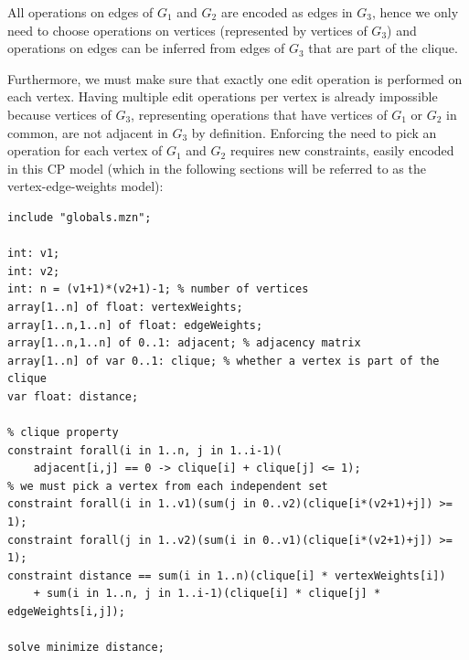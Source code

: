 \documentclass{article}
\theoremstyle{definition}
\begin{document}
All operations on edges of $G_1$ and $G_2$ are encoded as edges in $G_3$, hence we only need to choose operations on vertices (represented by vertices of $G_3$) and operations on edges can be inferred from edges of $G_3$ that are part of the clique.

Furthermore, we must make sure that exactly one edit operation is performed on each vertex. Having multiple edit operations per vertex is already impossible because vertices of $G_3$, representing operations that have vertices of $G_1$ or $G_2$ in common, are not adjacent in $G_3$ by definition. Enforcing the need to pick an operation for each vertex of $G_1$ and $G_2$ requires new constraints, easily encoded in this CP model (which in the following sections will be referred to as the vertex-edge-weights model):
\begin{lstlisting}
include "globals.mzn";

int: v1;
int: v2;
int: n = (v1+1)*(v2+1)-1; % number of vertices
array[1..n] of float: vertexWeights;
array[1..n,1..n] of float: edgeWeights;
array[1..n,1..n] of 0..1: adjacent; % adjacency matrix
array[1..n] of var 0..1: clique; % whether a vertex is part of the clique
var float: distance;

% clique property
constraint forall(i in 1..n, j in 1..i-1)(
    adjacent[i,j] == 0 -> clique[i] + clique[j] <= 1);
% we must pick a vertex from each independent set
constraint forall(i in 1..v1)(sum(j in 0..v2)(clique[i*(v2+1)+j]) >= 1);
constraint forall(j in 1..v2)(sum(i in 0..v1)(clique[i*(v2+1)+j]) >= 1);
constraint distance == sum(i in 1..n)(clique[i] * vertexWeights[i])
    + sum(i in 1..n, j in 1..i-1)(clique[i] * clique[j] * edgeWeights[i,j]);

solve minimize distance;
\end{lstlisting}
\end{document}
